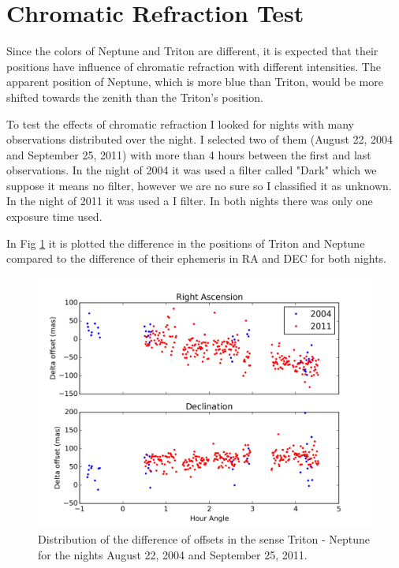 \documentclass[12pt,a4paper]{report}
\begin{document}
\section*{Chromatic Refraction Test}

Since the colors of Neptune and Triton are different, it is expected that their positions have influence of chromatic refraction with different intensities. The apparent position of Neptune, which is more blue than Triton, would be more shifted towards the zenith than the Triton's position.

To test the effects of chromatic refraction I looked for nights with many observations distributed over the night. I selected two of them (August 22, 2004 and September 25, 2011) with more than 4 hours between the first and last observations. In the night of 2004 it was used a filter called "Dark" which we suppose it means no filter, however we are no sure so I classified it as unknown. In the night of 2011 it was used a I filter. In both nights there was only one exposure time used.

In Fig \ref{Fig:refraction} it is plotted the difference in the positions of Triton and Neptune compared to the difference of their ephemeris in RA and DEC for both nights.

\begin{figure}[h]
\includegraphics[width=16.0cm]{plot_hour_gr1.png} 
\caption{Distribution of the difference of offsets in the sense Triton - Neptune for the nights August 22, 2004 and September 25, 2011.}
\label{Fig:refraction}
\end{figure}
\end{document}
